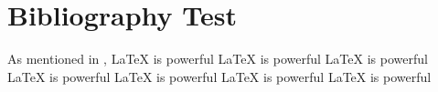 \documentclass[12pt,palatino,nohangbib]{ui1activity}
\begin{document}
\makecustomcover
\tableofcontents
\newpage

\section{Bibliography Test}
As mentioned in \cite{sample}, LaTeX is powerful LaTeX is powerful
LaTeX is powerful LaTeX is powerful LaTeX is powerful LaTeX is
powerful LaTeX is powerful

\makebibliography
\end{document}

